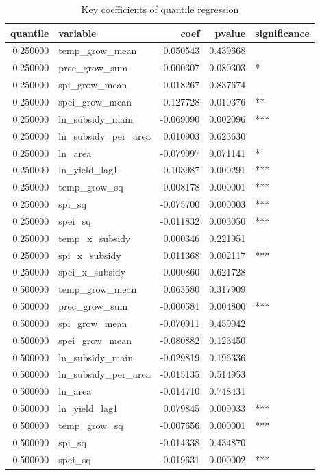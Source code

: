 \begin{table}
\caption{Key coefficients of quantile regression}
\label{tab:quantile}
\begin{tabular}{rlrrl}
\toprule
quantile & variable & coef & pvalue & significance \\
\midrule
0.250000 & temp_grow_mean & 0.050543 & 0.439668 &  \\
0.250000 & prec_grow_sum & -0.000307 & 0.080303 & * \\
0.250000 & spi_grow_mean & -0.018267 & 0.837674 &  \\
0.250000 & spei_grow_mean & -0.127728 & 0.010376 & ** \\
0.250000 & ln_subsidy_main & -0.069090 & 0.002096 & *** \\
0.250000 & ln_subsidy_per_area & 0.010903 & 0.623630 &  \\
0.250000 & ln_area & -0.079997 & 0.071141 & * \\
0.250000 & ln_yield_lag1 & 0.103987 & 0.000291 & *** \\
0.250000 & temp_grow_sq & -0.008178 & 0.000001 & *** \\
0.250000 & spi_sq & -0.075700 & 0.000003 & *** \\
0.250000 & spei_sq & -0.011832 & 0.003050 & *** \\
0.250000 & temp_x_subsidy & 0.000346 & 0.221951 &  \\
0.250000 & spi_x_subsidy & 0.011368 & 0.002117 & *** \\
0.250000 & spei_x_subsidy & 0.000860 & 0.621728 &  \\
0.500000 & temp_grow_mean & 0.063580 & 0.317909 &  \\
0.500000 & prec_grow_sum & -0.000581 & 0.004800 & *** \\
0.500000 & spi_grow_mean & -0.070911 & 0.459042 &  \\
0.500000 & spei_grow_mean & -0.080882 & 0.123450 &  \\
0.500000 & ln_subsidy_main & -0.029819 & 0.196336 &  \\
0.500000 & ln_subsidy_per_area & -0.015135 & 0.514953 &  \\
0.500000 & ln_area & -0.014710 & 0.748431 &  \\
0.500000 & ln_yield_lag1 & 0.079845 & 0.009033 & *** \\
0.500000 & temp_grow_sq & -0.007656 & 0.000001 & *** \\
0.500000 & spi_sq & -0.014338 & 0.434870 &  \\
0.500000 & spei_sq & -0.019631 & 0.000002 & *** \\

\end{tabular}
\end{table}

